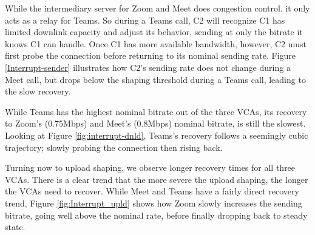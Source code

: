 While the intermediary server for Zoom and Meet does congestion control, it only acts as a relay for Teams. So during a Teams call, C2 will recognize C1 has limited downlink capacity and adjust its behavior, sending at only the bitrate it knows C1 can handle. Once C1 has more available bandwidth, however, C2 must first probe the connection before returning to its nominal sending rate. Figure \ref{Interrupt-sender} illustrates how C2's sending rate does not change during a Meet call, but drops below the shaping threshold during a Teams call, leading to the slow recovery.

While Teams has the highest nominal bitrate out of the three VCAs, its recovery to Zoom's (0.75Mbps) and Meet's (0.8Mbps) nominal bitrate, is still the slowest. Looking at Figure \ref{fig:interrupt-dnld}, Teams's recovery follows a seemingly cubic trajectory; slowly probing the connection then rising back.


Turning now to upload shaping, we observe longer recovery times for all three VCAs. There is a clear trend that the more severe the upload shaping, the longer the VCAs need to recover. While Meet and Teams have a fairly direct recovery trend, Figure \ref{fig:Interrupt_upld} shows how Zoom slowly increases the sending bitrate, going well above the nominal rate, before finally dropping back to steady state. 







